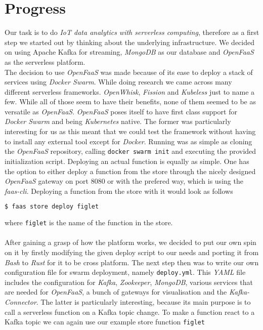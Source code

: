 \section{Progress}

Our task is to do \textit{IoT data analytics with serverless computing}, therefore as a first step we started out by thinking about the underlying infrastructure. We decided on using Apache Kafka for streaming,  \textit{MongoDB} as our database and \textit{OpenFaaS} as the serverless platform. \\
The decision to use \textit{OpenFaaS} was made because of its ease to deploy a stack of services using \textit{Docker Swarm}.
While doing research we came across many different serverless frameworks. \textit{OpenWhisk}, \textit{Fission} and \textit{Kubeless} just to name a few. While all of those seem to have their benefits, none of them seemed to be as versatile as \textit{OpenFaaS}. \textit{OpenFaaS} poses itself to have first class support for \textit{Docker Swarm} and being \textit{Kubernetes} native. The former was particularly interesting for us as this meant that we could test the framework without having to install any external tool except for  \textit{Docker}. Running was as simple as cloning the \textit{OpenFaaS} repository, calling \texttt{docker swarm init} and executing the provided initialization script. Deploying an actual function is equally as simple. One has the option to either deploy a function from the store through the nicely designed  \textit{OpenFaaS} gateway on port 8080 or with the prefered way, which is using the \textit{faas-cli}. Deploying a function from the store with it would look as follows

\begin{lstlisting}[language=bash]
  $ faas store deploy figlet
\end{lstlisting}

where \texttt{figlet} is the name of the function in the store.\\
\\
After gaining a grasp of how the platform works, we decided to put our own spin on it by firstly modifying the given deploy script to our needs and porting it from \textit{Bash} to \textit{Rust} for it to be cross platform. The next step then was to write our own configuration file for swarm deployment, namely \texttt{deploy.yml}. This \textit{YAML} file includes the configuration for \textit{Kafka}, \textit{Zookeeper}, \textit{MongoDB}, various services that are needed for \textit{OpenFaaS}, a bunch of gateways for visualisation and the \textit{Kafka-Connector}. The latter is particularly interesting, because its main purpose is to call a serverless function on a Kafka topic change. To make a function react to a Kafka topic we can again use our example store function \texttt{figlet}

